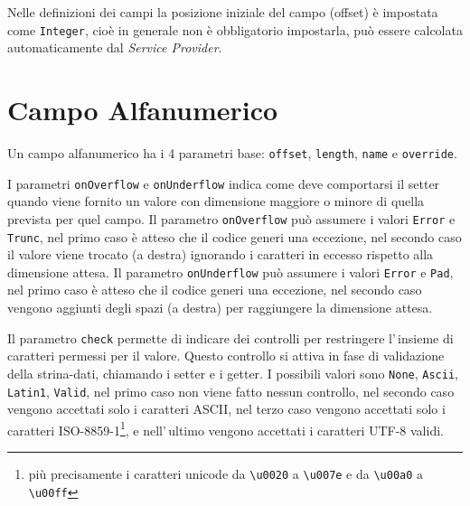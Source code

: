 Nelle definizioni dei campi la posizione iniziale del campo (offset) è impostata 
come \texttt{Integer}, cioè in generale non è obbligatorio impostarla, può 
essere calcolata automaticamente dal \textsl{Service Provider}.

\section{Campo Alfanumerico}
Un campo alfanumerico ha i 4 parametri base: \verb!offset!, \verb!length!,
\verb!name! e \verb!override!.

I parametri \verb!onOverflow! e \verb!onUnderflow! indica come deve comportarsi
il setter quando viene fornito un valore con dimensione maggiore o minore di
quella prevista per quel campo.
Il parametro \hypertarget{abc:ovf}{\texttt{onOverflow}} può assumere i valori 
\verb!Error! e \verb!Trunc!, nel primo caso è atteso che il codice generi una 
eccezione, nel secondo caso il valore viene trocato (a destra) ignorando i 
caratteri in eccesso rispetto alla dimensione attesa.
Il parametro \hypertarget{abc:unf}{\texttt{onUnderflow}} può assumere i valori 
\verb!Error! e \verb!Pad!, nel primo caso è atteso che il codice generi una 
eccezione, nel secondo caso vengono aggiunti degli spazi (a destra) per 
raggiungere la dimensione attesa.

Il parametro \hypertarget{abc:chk}{\texttt{check}} permette di indicare dei 
controlli per restringere l'\,insieme di caratteri permessi per il valore. 
Questo controllo si attiva in fase di validazione della strina-dati, chiamando 
i setter e i getter.
I possibili valori sono \verb!None!, \verb!Ascii!, \verb!Latin1!, \verb!Valid!,
nel primo caso non viene fatto nessun controllo, nel secondo caso vengono 
accettati solo i caratteri ASCII, nel terzo caso vengono accettati solo i 
caratteri ISO-8859-1\footnote{più precisamente i caratteri unicode da 
\texttt{\textbackslash u0020} a \texttt{\textbackslash u007e} e 
da \texttt{\textbackslash u00a0} a \texttt{\textbackslash u00ff}}, e 
nell'\,ultimo vengono accettati i caratteri UTF-8 validi.

